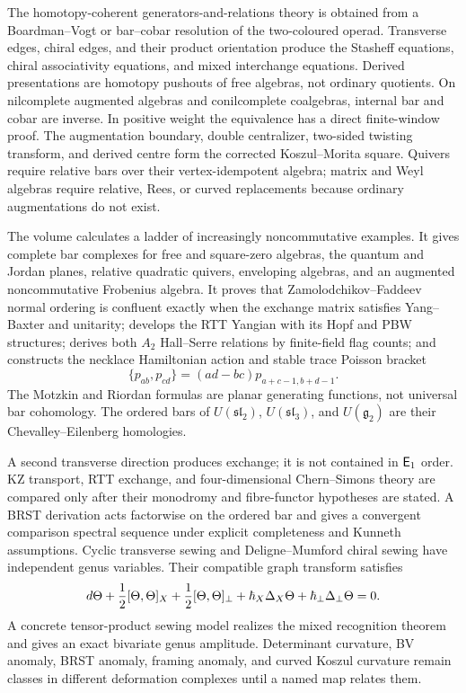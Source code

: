 The homotopy-coherent generators-and-relations theory is obtained from a Boardman--Vogt or bar--cobar resolution of the two-coloured operad.  Transverse edges, chiral edges, and their product orientation produce the Stasheff equations, chiral associativity equations, and mixed interchange equations.  Derived presentations are homotopy pushouts of free algebras, not ordinary quotients.  On nilcomplete augmented algebras and conilcomplete coalgebras, internal bar and cobar are inverse.  In positive weight the equivalence has a direct finite-window proof.  The augmentation boundary, double centralizer, two-sided twisting transform, and derived centre form the corrected Koszul--Morita square.  Quivers require relative bars over their vertex-idempotent algebra; matrix and Weyl algebras require relative, Rees, or curved replacements because ordinary augmentations do not exist.

The volume calculates a ladder of increasingly noncommutative examples.  It gives complete bar complexes for free and square-zero algebras, the quantum and Jordan planes, relative quadratic quivers, enveloping algebras, and an augmented noncommutative Frobenius algebra.  It proves that Zamolodchikov--Faddeev normal ordering is confluent exactly when the exchange matrix satisfies Yang--Baxter and unitarity; develops the RTT Yangian with its Hopf and PBW structures; derives both \(A_2\) Hall--Serre relations by finite-field flag counts; and constructs the necklace Hamiltonian action and stable trace Poisson bracket
\[
 \{p_{ab},p_{cd}\}=(ad-bc)p_{a+c-1,b+d-1}.
\]
The Motzkin and Riordan formulas are planar generating functions, not
universal bar cohomology.  The ordered bars of \(U(\mathfrak{sl}_2)\),
\(U(\mathfrak{sl}_3)\), and \(U(\mathfrak g_2)\) are their
Chevalley--Eilenberg homologies.

A second transverse direction produces exchange; it is not contained in \(\mathsf E_1\) order.  KZ transport, RTT exchange, and four-dimensional Chern--Simons theory are compared only after their monodromy and fibre-functor hypotheses are stated.  A BRST derivation acts factorwise on the ordered bar and gives a convergent comparison spectral sequence under explicit completeness and Kunneth assumptions.  Cyclic transverse sewing and Deligne--Mumford chiral sewing have independent genus variables.  Their compatible graph transform satisfies
\[
 d\Theta+\frac12[\Theta,\Theta]_X+\frac12[\Theta,\Theta]_{\perp}
 +\hbar_X\Delta_X\Theta+\hbar_{\perp}\Delta_{\perp}\Theta=0.
\]
A concrete tensor-product sewing model realizes the mixed recognition theorem and gives an exact bivariate genus amplitude.  Determinant curvature, BV anomaly, BRST anomaly, framing anomaly, and curved Koszul curvature remain classes in different deformation complexes until a named map relates them.

